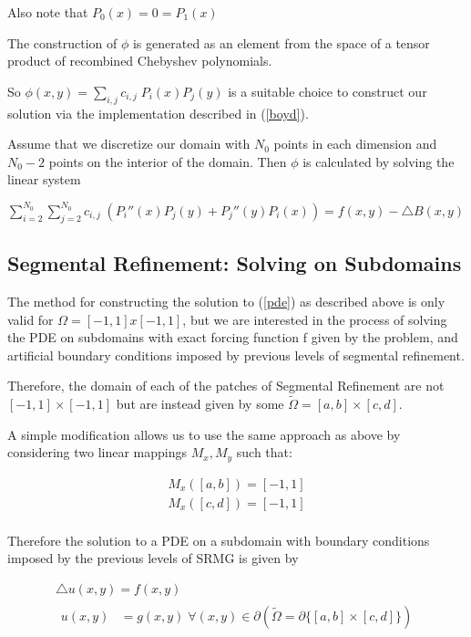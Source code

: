 \documentclass[final]{siamart1116}
\numberwithin{theorem}{section}
\begin{document}
Also note that $P_0(x) = 0 = P_1(x)$

The construction of $\phi$ is generated as an element from the space of a tensor product of recombined Chebyshev polynomials. 

So $\phi(x, y) = \sum_{i, j} c_{i, j} \; P_i (x) P_j(y) $ is a suitable choice to construct our solution via the implementation described in (\ref{boyd}). 

Assume that we discretize our domain with $N_0$ points in each dimension and $N_0-2$ points on the interior of the domain. Then $\phi$ is calculated by solving the linear system 

$ \sum_{i = 2}^{N_0} \sum_{j = 2}^{N_0}  c_{i, j} \; (P_i'' (x) P_j (y) + P_j''(y) P_i (x)) = f(x, y) - \bigtriangleup B(x, y)$




\subsection{Segmental Refinement: Solving on Subdomains}
The method for constructing the solution to (\ref{pde}) as described above is only valid for $\Omega = [-1, 1] x [-1, 1]$, but we are interested in the process of solving the PDE on subdomains with exact forcing function f given by the problem, and artificial boundary conditions imposed by previous levels of segmental refinement.  

Therefore, the domain of each of the patches of Segmental Refinement are not $[-1, 1] \times [-1, 1]$ but are instead given by some $\tilde{\Omega} = [a, b] \times [c, d]$.

A simple modification allows us to use the same approach as above by considering two linear mappings $M_x, M_y$ such that:

\begin{align*}
M_x([a,b]) = [-1, 1]\\
M_x([c,d]) = [-1, 1]\\
\end{align*}

Therefore the solution to a PDE on a subdomain with boundary conditions imposed by the previous levels of SRMG is given by

\begin{gather}
  \bigtriangleup u(x, y) = f(x, y) \\  
  \begin{split}
    u(x, y) &= g(x, y)  \; \forall (x, y) \in \partial (\tilde{\Omega} = \partial\{[a, b] \times [c, d]\} ) \nonumber \\
  \end{split}
\end{gather}
\end{document}

